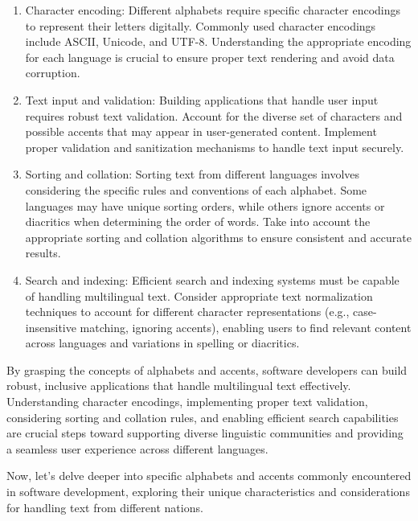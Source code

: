 \begin{enumerate}
  
\item Character encoding: Different alphabets require specific
  character encodings to represent their letters digitally. Commonly
  used character encodings include ASCII, Unicode, and
  UTF-8. Understanding the appropriate encoding for each language is
  crucial to ensure proper text rendering and avoid data corruption.

\item Text input and validation: Building applications that handle
  user input requires robust text validation. Account for the diverse
  set of characters and possible accents that may appear in
  user-generated content. Implement proper validation and sanitization
  mechanisms to handle text input securely.

\item Sorting and collation: Sorting text from different languages
  involves considering the specific rules and conventions of each
  alphabet. Some languages may have unique sorting orders, while
  others ignore accents or diacritics when determining the order of
  words. Take into account the appropriate sorting and collation
  algorithms to ensure consistent and accurate results.

\item Search and indexing: Efficient search and indexing systems must
  be capable of handling multilingual text. Consider appropriate text
  normalization techniques to account for different character
  representations (e.g., case-insensitive matching, ignoring accents),
  enabling users to find relevant content across languages and
  variations in spelling or diacritics.
\end{enumerate}

By grasping the concepts of alphabets and accents, software developers
can build robust, inclusive applications that handle multilingual text
effectively. Understanding character encodings, implementing proper
text validation, considering sorting and collation rules, and enabling
efficient search capabilities are crucial steps toward supporting
diverse linguistic communities and providing a seamless user
experience across different languages.

Now, let's delve deeper into specific alphabets and accents commonly
encountered in software development, exploring their unique
characteristics and considerations for handling text from different
nations.

